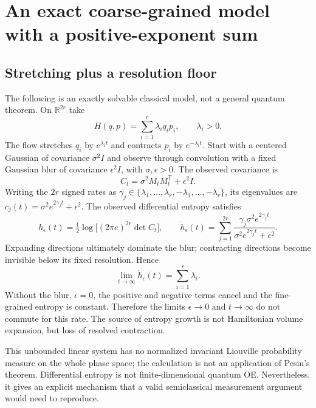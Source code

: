 \documentclass[11pt,a4paper]{article}
\begin{document}
\section{An exact coarse-grained model with a positive-exponent sum}
\label{sec:gaussian}
\subsection{Stretching plus a resolution floor}
The following is an exactly solvable classical model, not a general quantum theorem. On $\mathbb R^{2r}$ take
\[H(q,p)=\sum_{i=1}^r\lambda_iq_ip_i,\qquad\lambda_i>0.\]
The flow stretches $q_i$ by $e^{\lambda_it}$ and contracts $p_i$ by $e^{-\lambda_it}$. Start with a centered Gaussian of covariance $\sigma^2I$ and observe through convolution with a fixed Gaussian blur of covariance $\epsilon^2I$, with $\sigma,\epsilon>0$. The observed covariance is
\[C_t=\sigma^2M_tM_t^{\mathsf T}+\epsilon^2I.\]
Writing the $2r$ signed rates as $\gamma_j\in\{\lambda_1,\ldots,\lambda_r,-\lambda_1,\ldots,-\lambda_r\}$, its eigenvalues are $c_j(t)=\sigma^2e^{2\gamma_jt}+\epsilon^2$. The observed differential entropy satisfies
\[h_\epsilon(t)=\tfrac12\log\bigl[(2\pi e)^{2r}\det C_t\bigr],\qquad\dot h_\epsilon(t)=\sum_{j=1}^{2r}\frac{\gamma_j\sigma^2e^{2\gamma_jt}}{\sigma^2e^{2\gamma_jt}+\epsilon^2}.\]
Expanding directions ultimately dominate the blur; contracting directions become invisible below its fixed resolution. Hence
\[\lim_{t\to\infty}\dot h_\epsilon(t)=\sum_{i=1}^r\lambda_i.\]
Without the blur, $\epsilon=0$, the positive and negative terms cancel and the fine-grained entropy is constant. Therefore the limits $\epsilon\to0$ and $t\to\infty$ do not commute for this rate. The source of entropy growth is not Hamiltonian volume expansion, but loss of resolved contraction.

This unbounded linear system has no normalized invariant Liouville probability measure on the whole phase space; the calculation is not an application of Pesin's theorem. Differential entropy is not finite-dimensional quantum OE. Nevertheless, it gives an explicit mechanism that a valid semiclassical measurement argument would need to reproduce.
\end{document}
